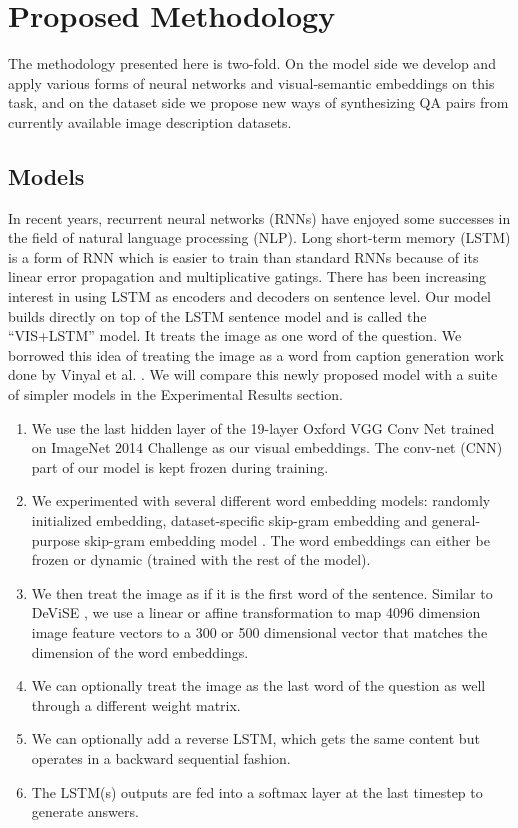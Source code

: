 \documentclass{article} %
\renewcommand{\#}[1]{\textbf{#1}}
\begin{document}
\section{Proposed Methodology}
The methodology presented here is two-fold. On the model side we develop and apply
various forms of neural networks and visual-semantic embeddings on this task,
and on the dataset  side we propose new ways of synthesizing QA pairs from
currently available image description datasets.

\subsection{Models}
In recent years, recurrent neural networks (RNNs) have enjoyed some successes in 
the field of natural language processing (NLP). Long short-term memory
(LSTM) \cite{hochreiter97} is a form of RNN which is easier to train than standard 
RNNs because of its linear error propagation and multiplicative gatings. There has 
been increasing interest in using LSTM as encoders and decoders on sentence level. 
Our model builds directly on top of the LSTM sentence model and is called the 
``VIS+LSTM'' model. It treats the image as one word of the question. We borrowed 
this idea of treating the image as a word from caption generation work done by 
Vinyal et al. \cite{vinyals14}. We will compare this newly proposed model with a suite of simpler models in the Experimental Results section.

\begin{enumerate}
    \item We use the last hidden layer of the 19-layer Oxford VGG Conv Net
      \cite{simonyan14} trained on ImageNet 2014 Challenge \cite{ilsvrc14} 
      as our visual
      embeddings. The conv-net (CNN) part of our model is kept frozen during
      training. 
    \item We experimented with several different word embedding models: randomly 
    initialized embedding, dataset-specific skip-gram embedding and general-purpose 
    skip-gram embedding model \cite{mikolov13}. The word embeddings can either 
    be frozen or dynamic (trained with the rest of the model).
    \item We then treat the image as if it is the first word of the
      sentence. Similar to DeViSE \cite{frome13}, we use a linear or affine
      transformation to map 4096 dimension image feature vectors to a 300 or
      500 dimensional vector that matches the dimension of the word embeddings.
    \item We can optionally treat the image as the last word of the question
      as well through a different weight matrix. 
    \item We can optionally add a reverse LSTM, which gets the same content
      but operates in a backward sequential fashion.
    \item The LSTM(s) outputs are fed into a softmax layer at the last
      timestep to generate answers.
\end{enumerate}
\end{document}

